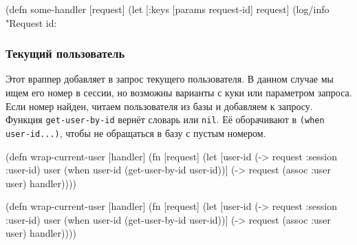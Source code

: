 \else

\begin{english}
  \begin{clojure}
(defn some-handler [request]
  (let [{:keys [params request-id]} request]
    (log/info "Request id: %
  \end{clojure}
\end{english}

\fi

\subsubsection*{Текущий пользователь}


Этот враппер добавляет в запрос текущего пользователя. В данном случае мы ищем
его номер в сессии, но возможны варианты с куки или параметром запроса. Если
номер найден, читаем пользователя из базы и добавляем к запросу. Функция
\verb|get-user-by-id| вернёт словарь или \verb|nil|. Её оборачивают в
\verb|(when user-id...)|, чтобы не обращаться в базу с пустым номером.


\ifnarrow

\begin{english}
  \begin{clojure}
(defn wrap-current-user [handler]
  (fn [request]
    (let [user-id (-> request
                      :session
                      :user-id)
          user (when user-id
                 (get-user-by-id
                   user-id))]
      (-> request
          (assoc :user user)
          handler))))
  \end{clojure}
\end{english}

\else

\begin{english}
  \begin{clojure}
(defn wrap-current-user [handler]
  (fn [request]
    (let [user-id (-> request :session :user-id)
          user (when user-id
                 (get-user-by-id user-id))]
      (-> request
          (assoc :user user)
          handler))))
  \end{clojure}
\end{english}

\fi


